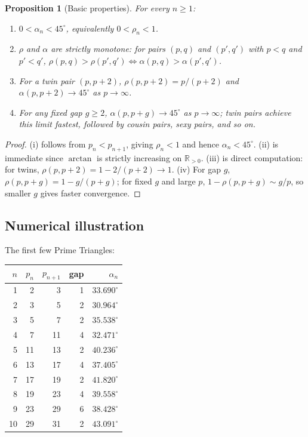 \documentclass[11pt]{article}
\newtheorem{proposition}[theorem]{Proposition}
\begin{document}
\begin{proposition}[Basic properties]\label{prop:basic}
For every $n\ge 1$:
\begin{enumerate}
\item[(i)] $0 < \alpha_n < 45^\circ$, equivalently $0 < \rho_n < 1$.
\item[(ii)] $\rho$ and $\alpha$ are strictly monotone: for pairs
$(p,q)$ and $(p',q')$ with $p<q$ and $p'<q'$,
$\rho(p,q) > \rho(p',q') \iff \alpha(p,q) > \alpha(p',q')$.
\item[(iii)] For a twin pair $(p, p+2)$,
$\rho(p,p+2) = p/(p+2)$ and $\alpha(p,p+2) \to 45^\circ$ as
$p \to \infty$.
\item[(iv)] For any fixed gap $g \ge 2$, $\alpha(p, p+g) \to 45^\circ$
as $p \to \infty$; twin pairs achieve this limit fastest, followed
by cousin pairs, sexy pairs, and so on.
\end{enumerate}
\end{proposition}

\begin{proof}
(i) follows from $p_n < p_{n+1}$, giving $\rho_n < 1$ and hence
$\alpha_n < 45^\circ$. (ii) is immediate since $\arctan$ is strictly
increasing on $\mathbb{R}_{>0}$. (iii) is direct computation: for twins,
$\rho(p,p+2) = 1 - 2/(p+2) \to 1$. (iv) For gap $g$,
$\rho(p,p+g) = 1 - g/(p+g)$; for fixed $g$ and large $p$,
$1 - \rho(p,p+g) \sim g/p$, so smaller $g$ gives faster convergence.
\end{proof}

\subsection{Numerical illustration}

The first few Prime Triangles:

\begin{center}
\begin{tabular}{rrrrr}
\toprule
$n$ & $p_n$ & $p_{n+1}$ & gap & $\alpha_n$ \\
\midrule
1 & 2 & 3 & 1 & $33.690^\circ$ \\
2 & 3 & 5 & 2 & $30.964^\circ$ \\
3 & 5 & 7 & 2 & $35.538^\circ$ \\
4 & 7 & 11 & 4 & $32.471^\circ$ \\
5 & 11 & 13 & 2 & $40.236^\circ$ \\
6 & 13 & 17 & 4 & $37.405^\circ$ \\
7 & 17 & 19 & 2 & $41.820^\circ$ \\
8 & 19 & 23 & 4 & $39.558^\circ$ \\
9 & 23 & 29 & 6 & $38.428^\circ$ \\
10 & 29 & 31 & 2 & $43.091^\circ$ \\
\bottomrule
\end{tabular}
\end{center}
\end{document}
